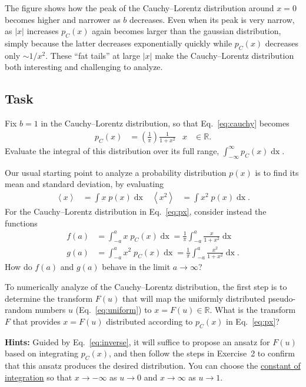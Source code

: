 \documentclass[12 pt]{article} %
\newcommand{\Rbb}{\ensuremath{\mathbb R} }
\renewcommand{\d}[1]{\ensuremath{\mathop{d#1}} }
\newcommand{\vev}[1]{\ensuremath{\left\langle #1 \right\rangle} }
\newcommand{\eq}[1]{Eq.~\ref{#1}}
\newcommand{\showmarks}[1]{\rightline{\texttt{[#1 marks]}}} %
\begin{document}
The figure shows how the peak of the Cauchy--Lorentz distribution around $x = 0$ becomes higher and narrower as $b$ decreases.
Even when its peak is very narrow, as $|x|$ increases $p_C(x)$ again becomes larger than the gaussian distribution, simply because the latter decreases exponentially quickly while $p_C(x)$ decreases only $\sim 1 / x^2$.
These ``fat tails'' at large $|x|$ make the Cauchy--Lorentz distribution both interesting and challenging to analyze.

\newpage %
\subsection*{Task}
Fix $b = 1$ in the Cauchy--Lorentz distribution, so that \eq{eq:cauchy} becomes
\begin{align}
  \label{eq:px}
  p_C(x) & = \left(\frac{1}{\pi}\right) \frac{1}{1 + x^2} &
  x & \in \Rbb.
\end{align}
Evaluate the integral of this distribution over its full range, $\displaystyle \int_{-\infty}^{\infty} p_C(x) \d{x}$.

\showmarks{2}

Our usual starting point to analyze a probability distribution $p(x)$ is to find its mean and standard deviation, by evaluating
\begin{align*}
  \vev{x} & = \int x \; p(x) \d{x} &
  \vev{x^2} & = \int x^2 \; p(x) \d{x}.
\end{align*}
For the Cauchy--Lorentz distribution in \eq{eq:px}, consider instead the functions
\begin{align*}
  f(a) & = \int_{-a}^a x \; p_C(x) \d{x} = \frac{1}{\pi} \int_{-a}^a \frac{x}{1 + x^2} \d{x} \\
  g(a) & = \int_{-a}^a x^2 \; p_C(x) \d{x} = \frac{1}{\pi} \int_{-a}^a \frac{x^2}{1 + x^2} \d{x}.
\end{align*}
How do $f(a)$ and $g(a)$ behave in the limit $a \to \infty$?

\showmarks{4}

To numerically analyze of the Cauchy--Lorentz distribution, the first step is to determine the transform $F(u)$ that will map the uniformly distributed pseudo-random numbers $u$ (\eq{eq:uniform}) to $x = F(u) \in \Rbb$.
What is the transform $F$ that provides $x = F(u)$ distributed according to $p_C(x)$ in \eq{eq:px}?

\textbf{Hints:} Guided by \eq{eq:inverse}, it will suffice to propose an ansatz for $F(u)$ based on integrating $p_C(x)$, and then follow the steps in Exercise~2 to confirm that this ansatz produces the desired distribution.
You can choose the \href{https://en.wikipedia.org/wiki/Constant_of_integration}{constant of integration} so that $x \to -\infty$ as $u \to 0$ and $x \to \infty$ as $u \to 1$.
\end{document}
